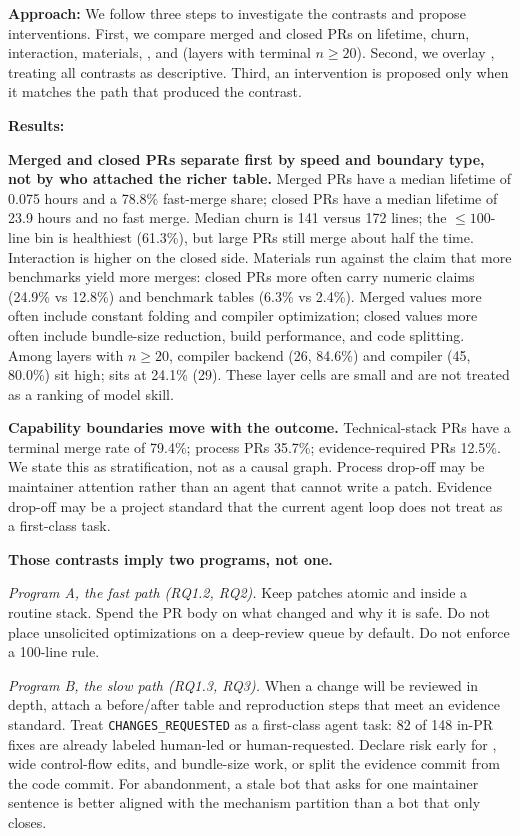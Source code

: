 \noindent\textbf{Approach:} We follow three steps to investigate the contrasts and propose interventions. First, we compare merged and closed PRs on lifetime, churn, interaction, materials, , and  (layers with terminal \(n \geq 20\)). Second, we overlay , treating all contrasts as descriptive. Third, an intervention is proposed only when it matches the path that produced the contrast.

\noindent\textbf{Results:} 

\textbf{Merged and closed PRs separate first by speed and boundary type, not by who attached the richer table.} Merged PRs have a median lifetime of 0.075 hours and a 78.8\% fast-merge share; closed PRs have a median lifetime of 23.9 hours and no fast merge. Median churn is 141 versus 172 lines; the \(\leq 100\)-line bin is healthiest (61.3\%), but large PRs still merge about half the time. Interaction is higher on the closed side. Materials run against the claim that more benchmarks yield more merges: closed PRs more often carry numeric claims (24.9\% vs 12.8\%) and benchmark tables (6.3\% vs 2.4\%). Merged  values more often include constant folding and compiler optimization; closed values more often include bundle-size reduction, build performance, and code splitting. Among layers with \(n \geq 20\), compiler backend (26, 84.6\%) and compiler (45, 80.0\%) sit high;  sits at 24.1\% (29). These layer cells are small and are not treated as a ranking of model skill.

\textbf{Capability boundaries move with the outcome.} Technical-stack PRs have a terminal merge rate of 79.4\%; process PRs 35.7\%; evidence-required PRs 12.5\%. We state this as stratification, not as a causal graph. Process drop-off may be maintainer attention rather than an agent that cannot write a patch. Evidence drop-off may be a project standard that the current agent loop does not treat as a first-class task.

\textbf{Those contrasts imply two programs, not one.}

\textit{Program A, the fast path (RQ1.2, RQ2).} Keep patches atomic and inside a routine stack. Spend the PR body on what changed and why it is safe. Do not place unsolicited optimizations on a deep-review queue by default. Do not enforce a 100-line rule.

\textit{Program B, the slow path (RQ1.3, RQ3).} When a change will be reviewed in depth, attach a before/after table and reproduction steps that meet an evidence standard. Treat \texttt{CHANGES\_REQUESTED} as a first-class agent task: 82 of 148 in-PR fixes are already labeled human-led or human-requested. Declare risk early for , wide control-flow edits, and bundle-size work, or split the evidence commit from the code commit. For abandonment, a stale bot that asks for one maintainer sentence is better aligned with the mechanism partition than a bot that only closes.

